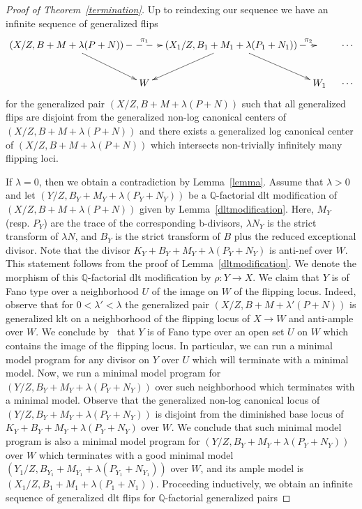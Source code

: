 \documentclass{amsart}
\renewcommand{\qq}{\mathbb{Q}}
\theoremstyle{remark}
\numberwithin{equation}{section}
\begin{document}
\begin{proof}[Proof of Theorem~\ref{termination}]
Up to reindexing our sequence we have an infinite sequence of generalized flips 
\[
 \xymatrix@C=1em{
(X/Z,B+M+\lambda(P+N))\ar@{-->}[rr]^-{\pi_1}\ar[rd] & & (X_1/Z,B_1+M_1+\lambda(P_1+N_1))\ar@{-->}[r]^-{\pi_2}\ar[ld] \ar[rd]&  &\cdots \\ 
& W & & W_1 & \cdots 
 }
\]
for the generalized pair $(X/Z,B+M+\lambda(P+N))$ such that all generalized flips are disjoint from the generalized
non-log canonical centers of $(X/Z,B+M+\lambda(P+N))$ and there exists a generalized log canonical center 
of $(X/Z,B+M+\lambda(P+N))$ which intersects non-trivially infinitely many flipping loci.

If $\lambda=0$, then we obtain a contradiction by Lemma~\ref{lemma}.
Assume that $\lambda>0$ and let 
$(Y/Z,B_Y+M_Y+\lambda(P_Y+N_Y))$ be a $\qq$-factorial dlt modification of $(X/Z,B+M+\lambda(P+N))$ given by Lemma~\ref{dltmodification}.
Here, $M_Y$ (resp. $P_Y$) are the trace of the corresponding b-divisors, 
$\lambda N_Y$ is the strict transform of $\lambda N$, 
and $B_Y$ is the strict transform of $B$ plus the reduced exceptional divisor.
Note that the divisor $K_Y+B_Y+M_Y+\lambda(P_Y+N_Y)$ is anti-nef over $W$.
This statement follows from the proof of Lemma~\ref{dltmodification}.
We denote the morphism of this $\qq$-factorial dlt modification by $\rho\colon Y \rightarrow X$.
We claim that $Y$ is of Fano type over a neighborhood $U$ of the image on $W$ of the flipping locus. 
Indeed, observe that for $0<\lambda' < \lambda$ the generalized pair 
$(X/Z,B+M+\lambda'(P+N))$ is generalized klt on a neighborhood of the flipping locus of $X\rightarrow W$
and anti-ample over $W$. 
We conclude by~\cite[2.10]{Bir17} that $Y$ is of Fano type over an open set $U$ on $W$ which contains the image of the flipping locus.
In particular, we can run a minimal model program for any divisor on $Y$ over $U$ which will terminate with a minimal model.
Now, we run a minimal model program for 
$(Y/Z,B_Y+M_Y+\lambda(P_Y+N_Y))$ over such neighborhood
which terminates with a minimal model.
Observe that the generalized non-log canonical locus of $(Y/Z,B_Y+M_Y+\lambda(P_Y+N_Y))$
is disjoint from the diminished base locus of $K_Y+B_Y+M_Y+\lambda(P_Y+N_Y)$ over $W$.
We conclude that such minimal model program is also a minimal model program 
for $(Y/Z,B_Y+M_Y+\lambda(P_Y+N_Y))$ over $W$ which terminates with a good minimal model
$(Y_1/Z,B_{Y_1}+M_{Y_1}+\lambda(P_{Y_1}+N_{Y_1}))$ over $W$,
and its ample model is $(X_1/Z,B_1+M_1+\lambda(P_1+N_1))$.
Proceeding inductively, we obtain an infinite sequence of generalized dlt flips for
$\qq$-factorial generalized pairs

\end{proof}
\end{document}

